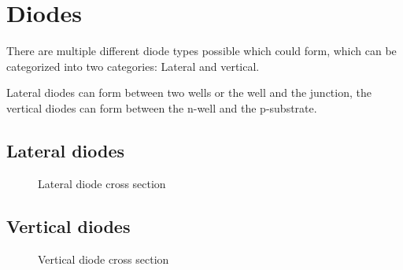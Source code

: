 \section{Diodes}
There are multiple different diode types possible which could form, which can be categorized into two categories: Lateral and vertical.

Lateral diodes can form between two wells or the well and the junction, the vertical diodes can form between the n-well and the p-substrate.

\subsection{Lateral diodes}

\begin{figure}[H]
	\centering
	\begin{tikzpicture}[node distance = 3cm, auto, thick,scale=0.5, every node/.style={transform shape}]
		
	\end{tikzpicture}
	\caption{Lateral diode cross section}
	\label{lateral_diode_cross_section}
\end{figure}

\subsection{Vertical diodes}

\begin{figure}[H]
	\centering
	\begin{tikzpicture}[node distance = 3cm, auto, thick,scale=0.5, every node/.style={transform shape}]
		
	\end{tikzpicture}
	\caption{Vertical diode cross section}
	\label{vertical_diode_cross_section}
\end{figure}

